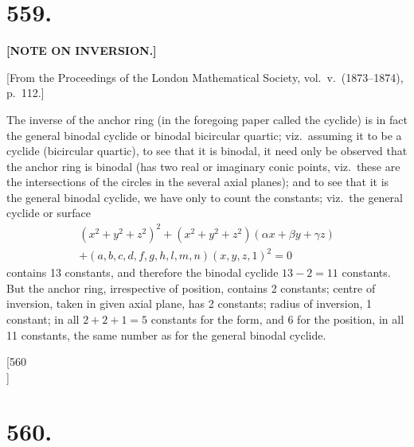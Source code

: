 \documentclass[12pt,a4paper]{article}
\theoremstyle{plain}
\theoremstyle{definition}
\begin{document}
\section*{\textbf{559.}}

\begin{center}
{\large \textbf{[NOTE ON INVERSION.]}}
\end{center}

\begin{flushright}
{\small [From the Proceedings of the London Mathematical Society, vol.\ v.\ (1873--1874), p.\ 112.]}
\end{flushright}

The inverse of the anchor ring (in the foregoing paper called the cyclide) is in fact the general binodal cyclide or binodal bicircular quartic; viz.\ assuming it to be a cyclide (bicircular quartic), to see that it is binodal, it need only be observed that the anchor ring is binodal (has two real or imaginary conic points, viz.\ these are the intersections of the circles in the several axial planes); and to see that it is the general binodal cyclide, we have only to count the constants; viz.\ the general cyclide or surface
\begin{multline*}
(x^2 + y^2 + z^2)^2 + (x^2 + y^2 + z^2)(\alpha x + \beta y + \gamma z)\\
+ (a, b, c, d, f, g, h, l, m, n)(x, y, z, 1)^2 = 0
\end{multline*}
contains 13 constants, and therefore the binodal cyclide $13 - 2 = 11$ constants. But the anchor ring, irrespective of position, contains 2 constants; centre of inversion, taken in given axial plane, has 2 constants; radius of inversion, 1 constant; in all $2 + 2 + 1 = 5$ constants for the form, and 6 for the position, in all 11 constants, the same number as for the general binodal cyclide.


\newpage
\setcounter{page}{19}

\begin{center}
[560\\
]
\end{center}

\section*{\textbf{560.}}
\end{document}
